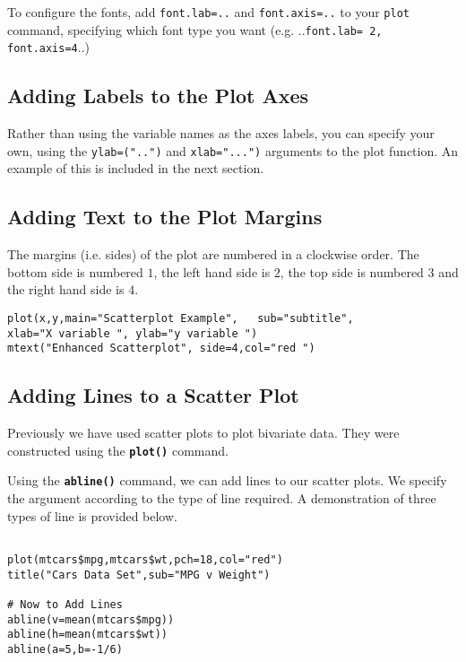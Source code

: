 To configure the fonts, add \texttt{font.lab=..} and \texttt{font.axis=..} to your \texttt{plot} command, specifying which font type you want (e.g. ..\texttt{font.lab= 2, font.axis=4}..)

\subsection{Adding Labels to the Plot Axes}
Rather than using the variable names as the axes labels, you can specify your own, using the \texttt{ylab=("..")} and \texttt{xlab="...")} arguments to the plot function. An example of this is included in the next section.
\subsection{Adding Text to the Plot Margins}

The margins (i.e. sides) of the plot are numbered in a clockwise order. The bottom side is numbered $1$, the left hand side is $2$, the top side is numbered $3$ and the right hand side is $4$.

\begin{framed}
\begin{verbatim}
plot(x,y,main="Scatterplot Example",   sub="subtitle",    
xlab="X variable ", ylab="y variable ")	
mtext("Enhanced Scatterplot", side=4,col="red ")
\end{verbatim}
\end{framed}





\subsection{Adding Lines to a Scatter Plot}
Previously we have used scatter plots to plot bivariate data. They were constructed using the \texttt{\textbf{plot()}} command.  

Using the \texttt{\textbf{abline()}} command, we can add lines to our scatter plots. We specify the argument according to the type of line required. A demonstration of three types of line is provided below.



\begin{framed}
\begin{verbatim}

plot(mtcars$mpg,mtcars$wt,pch=18,col="red")
title("Cars Data Set",sub="MPG v Weight")

# Now to Add Lines
abline(v=mean(mtcars$mpg))
abline(h=mean(mtcars$wt))
abline(a=5,b=-1/6)
\end{verbatim}
\end{framed}

